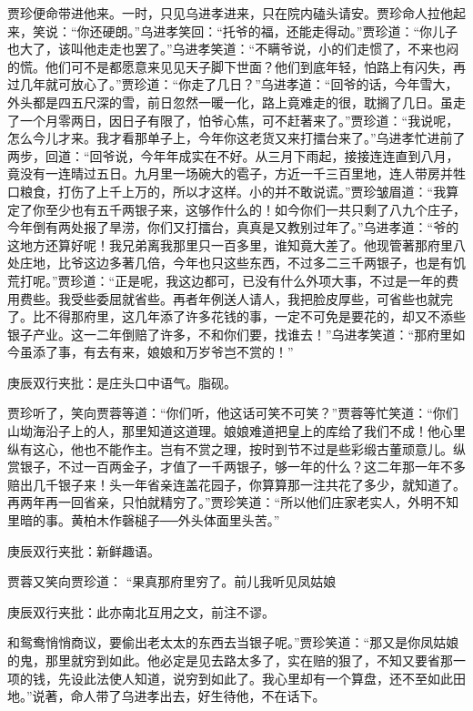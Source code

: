 \begin{parag}
    贾珍便命带进他来。一时，只见乌进孝进来，只在院内磕头请安。贾珍命人拉他起来，笑说：“你还硬朗。”乌进孝笑回：“托爷的福，还能走得动。”贾珍道：“你儿子也大了，该叫他走走也罢了。”乌进孝笑道：“不瞒爷说，小的们走惯了，不来也闷的慌。他们可不是都愿意来见见天子脚下世面？他们到底年轻，怕路上有闪失，再过几年就可放心了。”贾珍道：“你走了几日？”乌进孝道：“回爷的话，今年雪大，外头都是四五尺深的雪，前日忽然一暖一化，路上竟难走的很，耽搁了几日。虽走了一个月零两日，因日子有限了，怕爷心焦，可不赶著来了。”贾珍道：“我说呢，怎么今儿才来。我才看那单子上，今年你这老货又来打擂台来了。”乌进孝忙进前了两步，回道：“回爷说，今年年成实在不好。从三月下雨起，接接连连直到八月，竟没有一连晴过五日。九月里一场碗大的雹子，方近一千三百里地，连人带房并牲口粮食，打伤了上千上万的，所以才这样。小的并不敢说谎。”贾珍皱眉道：“我算定了你至少也有五千两银子来，这够作什么的！如今你们一共只剩了八九个庄子，今年倒有两处报了旱涝，你们又打擂台，真真是又教别过年了。”乌进孝道：“爷的这地方还算好呢！我兄弟离我那里只一百多里，谁知竟大差了。他现管著那府里八处庄地，比爷这边多著几倍，今年也只这些东西，不过多二三千两银子，也是有饥荒打呢。”贾珍道：“正是呢，我这边都可，已没有什么外项大事，不过是一年的费用费些。我受些委屈就省些。再者年例送人请人，我把脸皮厚些，可省些也就完了。比不得那府里，这几年添了许多花钱的事，一定不可免是要花的，却又不添些银子产业。这一二年倒赔了许多，不和你们要，找谁去！”乌进孝笑道：“那府里如今虽添了事，有去有来，娘娘和万岁爷岂不赏的！”\begin{note}庚辰双行夹批：是庄头口中语气。脂砚。\end{note}贾珍听了，笑向贾蓉等道：“你们听，他这话可笑不可笑？”贾蓉等忙笑道：“你们山坳海沿子上的人，那里知道这道理。娘娘难道把皇上的库给了我们不成！他心里纵有这心，他也不能作主。岂有不赏之理，按时到节不过是些彩缎古董顽意儿。纵赏银子，不过一百两金子，才值了一千两银子，够一年的什么？这二年那一年不多赔出几千银子来！头一年省亲连盖花园子，你算算那一注共花了多少，就知道了。再两年再一回省亲，只怕就精穷了。”贾珍笑道：“所以他们庄家老实人，外明不知里暗的事。黄柏木作磬槌子──外头体面里头苦。”\begin{note}庚辰双行夹批：新鲜趣语。\end{note}贾蓉又笑向贾珍道： “果真那府里穷了。前儿我听见凤姑娘\begin{note}庚辰双行夹批：此亦南北互用之文，前注不谬。\end{note}和鸳鸯悄悄商议，要偷出老太太的东西去当银子呢。”贾珍笑道：“那又是你凤姑娘的鬼，那里就穷到如此。他必定是见去路太多了，实在赔的狠了，不知又要省那一项的钱，先设此法使人知道，说穷到如此了。我心里却有一个算盘，还不至如此田地。”说著，命人带了乌进孝出去，好生待他，不在话下。
\end{parag}


